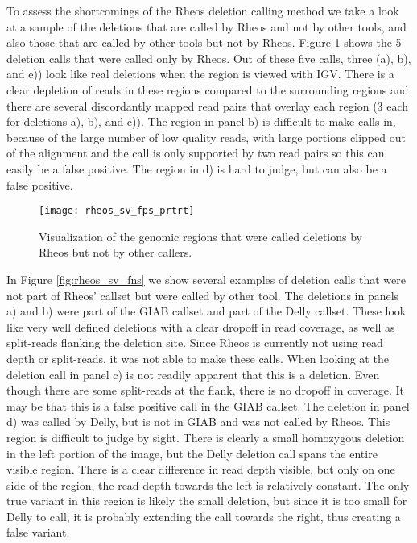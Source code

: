 To assess the shortcomings of the Rheos deletion calling method we take a look at a sample of the deletions that are called by Rheos and not by other tools, and also those that are called by other tools but not by Rheos. Figure \ref{fig:rheos_sv_fps} shows the 5 deletion calls that were called only by Rheos. Out of these five calls, three (a), b), and e)) look like real deletions when the region is viewed with IGV. There is a clear depletion of reads in these regions compared to the surrounding regions and there are several discordantly mapped read pairs that overlay each region (3 each for deletions a), b), and c)). The region in panel b) is difficult to make calls in, because of the large number of low quality reads, with large portions clipped out of the alignment and the call is only supported by two read pairs so this can easily be a false positive. The region in d) is hard to judge, but can also be a false positive. 

\begin{figure}[h!]
    \texttt{[image: rheos\_sv\_fps\_prtrt]}
    \centering
    \caption {Visualization of the genomic regions that were called deletions by Rheos but not by other callers.}
    \label{fig:rheos_sv_fps}
\end{figure}

In Figure \ref{fig:rheos_sv_fns} we show several examples of deletion calls that were not part of Rheos' callset but were called by other tool. The deletions in panels a) and b) were part of the GIAB callset and part of the Delly callset. These look like very well defined deletions with a clear dropoff in read coverage, as well as split-reads flanking the deletion site. Since Rheos is currently not using read depth or split-reads, it was not able to make these calls. When looking at the deletion call in panel c) is not readily apparent that this is a deletion. Even though there are some split-reads at the flank, there is no dropoff in coverage. It may be that this is a false positive call in the GIAB callset. The deletion in panel d) was called by Delly, but is not in GIAB and was not called by Rheos. This region is difficult to judge by sight. There is clearly a small homozygous deletion in the left portion of the image, but the Delly deletion call spans the entire visible region. There is a clear difference in read depth visible, but only on one side of the region, the read depth towards the left is relatively constant. The only true variant in this region is likely the small deletion, but since it is too small for Delly to call, it is probably extending the call towards the right, thus creating a false variant. 

